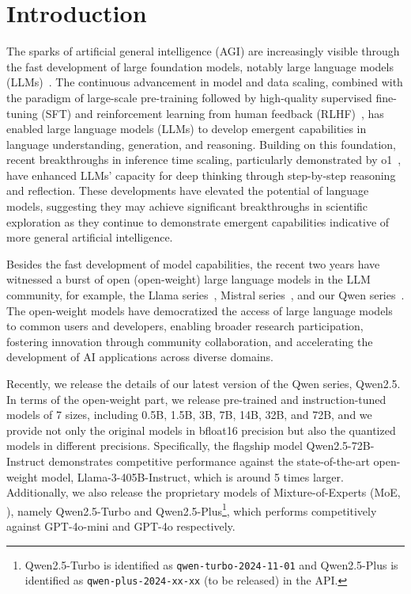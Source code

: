 \section{Introduction}
\label{sec:intro}

The sparks of artificial general intelligence (AGI) are increasingly visible through the fast development of large foundation models, notably large language models (LLMs)~\citep{gpt3,gpt4,gpt4o,gemini,claude,claude2,claude3,qwen,qwen2,llama,llama2,llama3}. The continuous advancement in model and data scaling, combined with the paradigm of large-scale pre-training followed by high-quality supervised fine-tuning (SFT) and reinforcement learning from human feedback (RLHF)~\citep{instructgpt}, has enabled large language models (LLMs) to develop emergent capabilities in language understanding, generation, and reasoning. Building on this foundation, recent breakthroughs in inference time scaling, particularly demonstrated by o1~\citep{o1}, have enhanced LLMs' capacity for deep thinking through step-by-step reasoning and reflection. These developments have elevated the potential of language models, suggesting they may achieve significant breakthroughs in scientific exploration as they continue to demonstrate emergent capabilities indicative of more general artificial intelligence.

Besides the fast development of model capabilities, the recent two years have witnessed a burst of open (open-weight) large language models in the LLM community, for example, the Llama series~\citep{llama, llama2, llama3}, Mistral series~\citep{mistral, mixtral}, and our Qwen series~\citep{qwen, qwen2, codeqwen, qwen2.5coder, qwen2math, qwen2.5math}. The open-weight models have democratized the access of large language models to common users and developers, enabling broader research participation, fostering innovation through community collaboration, and accelerating the development of AI applications across diverse domains.



Recently, we release the details of our latest version of the Qwen series, Qwen2.5. In terms of the open-weight part, we release pre-trained and instruction-tuned models of 7 sizes, including 0.5B, 1.5B, 3B, 7B, 14B, 32B, and 72B, and we provide not only the original models in bfloat16 precision but also the quantized models in different precisions. Specifically, the flagship model Qwen2.5-72B-Instruct demonstrates competitive performance against the state-of-the-art open-weight model, Llama-3-405B-Instruct, which is around 5 times larger. Additionally, we also release the proprietary models of Mixture-of-Experts (MoE, \citealp{gshard, switch_transformer, stmoe}), namely Qwen2.5-Turbo and Qwen2.5-Plus\footnote{Qwen2.5-Turbo is identified as \texttt{qwen-turbo-2024-11-01} and Qwen2.5-Plus is identified as \texttt{qwen-plus-2024-xx-xx} (to be released) in the API.}, which performs competitively against GPT-4o-mini and GPT-4o respectively. 




